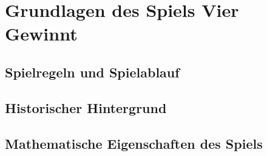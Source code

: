 \chapter{Grundlagen des Spiels Vier Gewinnt}

\section{Spielregeln und Spielablauf}
\section{Historischer Hintergrund}
\section{Mathematische Eigenschaften des Spiels}
